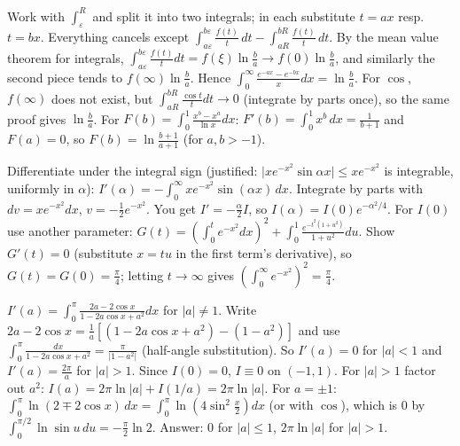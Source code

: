 \documentclass[11pt,a4paper]{article}
\begin{document}

Work with \(\int_\varepsilon^R\) and split it into two integrals; in each substitute \(t=ax\) resp. \(t=bx\). Everything cancels except \(\int_{a\varepsilon}^{b\varepsilon}\frac{f(t)}t\,dt-\int_{aR}^{bR}\frac{f(t)}t\,dt\).
By the mean value theorem for integrals, \(\int_{a\varepsilon}^{b\varepsilon}\frac{f(t)}tdt=f(\xi)\ln\frac ba\to f(0)\ln\frac ba\), and similarly the second piece tends to \(f(\infty)\ln\frac ba\). Hence \(\int_0^\infty\frac{e^{-ax}-e^{-bx}}x dx=\ln\frac ba\). For \(\cos\), \(f(\infty)\) does not exist, but \(\int_{aR}^{bR}\frac{\cos t}tdt\to0\) (integrate by parts once), so the same proof gives \(\ln\frac ba\).
For \(F(b)=\int_0^1\frac{x^b-x^a}{\ln x}dx\): \(F'(b)=\int_0^1x^b\,dx=\frac1{b+1}\) and \(F(a)=0\), so \(F(b)=\ln\frac{b+1}{a+1}\) (for \(a,b\gt -1\)).

Differentiate under the integral sign (justified: \(\lvert x e^{-x^2}\sin\alpha x\rvert\le xe^{-x^2}\) is integrable, uniformly in \(\alpha\)): \(I'(\alpha)=-\int_0^\infty xe^{-x^2}\sin(\alpha x)\,dx\). Integrate by parts with \(dv=xe^{-x^2}dx\), \(v=-\frac12e^{-x^2}\).
You get \(I'=-\frac\alpha2I\), so \(I(\alpha)=I(0)e^{-\alpha^2/4}\).
For \(I(0)\) use another parameter: \(G(t)=\left(\int_0^te^{-x^2}dx\right)^2+\int_0^1\frac{e^{-t^2(1+u^2)}}{1+u^2}du\). Show \(G'(t)=0\) (substitute \(x=tu\) in the first term's derivative), so \(G(t)=G(0)=\frac\pi4\); letting \(t\to\infty\) gives \(\left(\int_0^\infty e^{-x^2}\right)^2=\frac\pi4\).

\(I'(a)=\int_0^\pi\frac{2a-2\cos x}{1-2a\cos x+a^2}dx\) for \(\lvert a\rvert\ne1\). Write \(2a-2\cos x=\frac1a\left[(1-2a\cos x+a^2)-(1-a^2)\right]\) and use \(\int_0^\pi\frac{dx}{1-2a\cos x+a^2}=\frac{\pi}{\lvert 1-a^2\rvert}\) (half-angle substitution).
So \(I'(a)=0\) for \(\lvert a\rvert\lt1\) and \(I'(a)=\frac{2\pi}a\) for \(\lvert a\rvert\gt1\). Since \(I(0)=0\), \(I\equiv0\) on \((-1,1)\). For \(\lvert a\rvert\gt1\) factor out \(a^2\): \(I(a)=2\pi\ln\lvert a\rvert+I(1/a)=2\pi\ln\lvert a\rvert\).
For \(a=\pm1\): \(\int_0^\pi\ln(2\mp2\cos x)\,dx=\int_0^\pi\ln\left(4\sin^2\tfrac x2\right)dx\) (or with \(\cos\)), which is \(0\) by \(\int_0^{\pi/2}\ln\sin u\,du=-\frac\pi2\ln2\). Answer: \(0\) for \(\lvert a\rvert\le1\), \(2\pi\ln\lvert a\rvert\) for \(\lvert a\rvert\gt1\).
\end{document}
